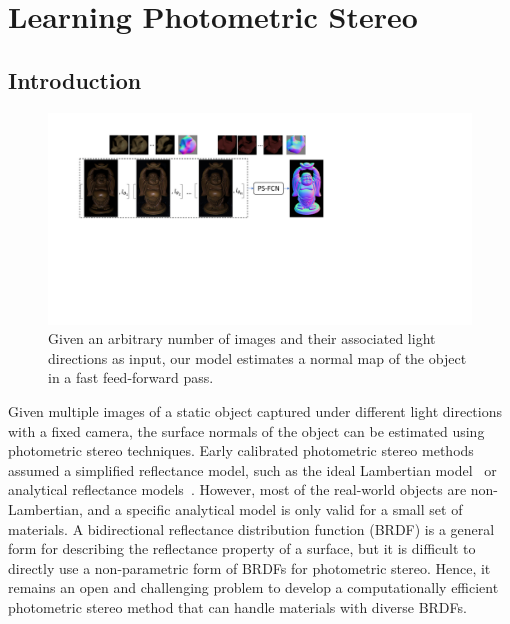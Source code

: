 \chapter{Learning Photometric Stereo} 
\label{ch:psfcn}

\section{Introduction}
\begin{figure}[t]
\centering
    \includegraphics[width=\textwidth]{ch-psfcn/images/Intro/Intro.pdf}
    \caption[Learning photometric stereo]{Given an arbitrary number of images and their associated light directions as input, our model estimates a normal map of the object in a fast feed-forward pass.} \label{fig:Intro}
\end{figure}

Given multiple images of a static object captured under different light directions with a fixed camera, the surface normals of the object can be estimated using photometric stereo techniques. 
Early calibrated photometric stereo methods assumed a simplified reflectance model, such as the ideal Lambertian model~\cite{woodham1980ps,silver1980determining} or analytical reflectance models~\cite{tozza2016direct,chung2008efficient,ruiters2009heightfield}. 
However, most of the real-world objects are non-Lambertian, and a specific analytical model is only valid for a small set of materials. A bidirectional reflectance distribution function (BRDF) is a general form for describing the reflectance property of a surface, but it is difficult to directly use a non-parametric form of BRDFs for photometric stereo. 
Hence, it remains an open and challenging problem to develop a computationally efficient photometric stereo method that can handle materials with diverse BRDFs. 

